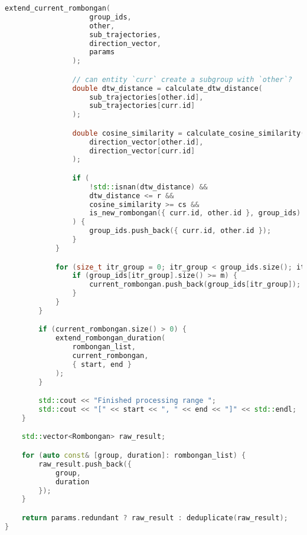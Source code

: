 \begin{lstlisting}[language=C++, caption=Implementasi modul \texttt{rombongan.cpp}, label={lamp:module-rombongan}]
                extend_current_rombongan(
                    group_ids,
                    other,
                    sub_trajectories,
                    direction_vector,
                    params
                );

                // can entity `curr` create a subgroup with `other`?
                double dtw_distance = calculate_dtw_distance(
                    sub_trajectories[other.id],
                    sub_trajectories[curr.id]
                );

                double cosine_similarity = calculate_cosine_similarity(
                    direction_vector[other.id],
                    direction_vector[curr.id]
                );

                if (
                    !std::isnan(dtw_distance) &&
                    dtw_distance <= r &&
                    cosine_similarity >= cs &&
                    is_new_rombongan({ curr.id, other.id }, group_ids)
                ) {
                    group_ids.push_back({ curr.id, other.id });
                }
            }

            for (size_t itr_group = 0; itr_group < group_ids.size(); itr_group++) {
                if (group_ids[itr_group].size() >= m) {
                    current_rombongan.push_back(group_ids[itr_group]);
                }
            }
        }

        if (current_rombongan.size() > 0) {
            extend_rombongan_duration(
                rombongan_list,
                current_rombongan,
                { start, end }
            );
        }

        std::cout << "Finished processing range ";
        std::cout << "[" << start << ", " << end << "]" << std::endl;
    }

    std::vector<Rombongan> raw_result;

    for (auto const& [group, duration]: rombongan_list) {
        raw_result.push_back({
            group,
            duration
        });
    }

    return params.redundant ? raw_result : deduplicate(raw_result);
}
\end{lstlisting}

